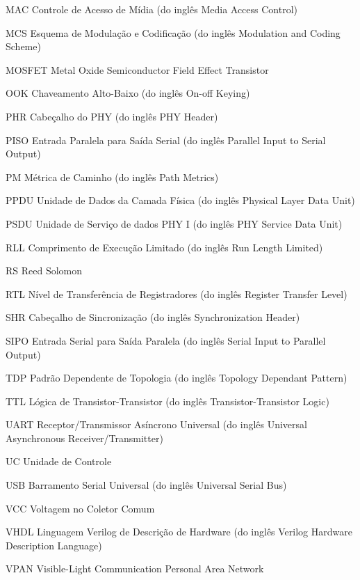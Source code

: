 \documentclass[
	12pt,				%
	openright,			%
	oneside,			%
	a4paper,			%
	hyphens,			%
	english,			%
	brazil				%
]{abntex2}
\begin{document}
\begin{siglas}
		\item[MAC] Controle de Acesso de Mídia (do inglês Media Access Control)
		\item[MCS] Esquema de Modulação e Codificação (do inglês Modulation and Coding Scheme)
		\item[MOSFET] Metal Oxide Semiconductor Field Effect Transistor
		\item[OOK] Chaveamento Alto-Baixo (do inglês On-off Keying)
		\item[PHR] Cabeçalho do PHY (do inglês PHY Header)
		\item[PISO] Entrada Paralela para Saída Serial (do inglês Parallel Input to Serial Output)
		\item[PM] Métrica de Caminho (do inglês Path Metrics)
		\item[PPDU] Unidade de Dados da Camada Física (do inglês Physical Layer Data Unit)
		\item[PSDU] Unidade de Serviço de dados PHY I (do inglês PHY Service Data Unit)
		\item[RLL] Comprimento de Execução Limitado (do inglês Run Length Limited)
		\item[RS] Reed Solomon
		\item[RTL] Nível de Transferência de Registradores (do inglês Register Transfer Level)
		\item[SHR] Cabeçalho de Sincronização (do inglês Synchronization Header)
		\item[SIPO] Entrada Serial para Saída Paralela (do inglês Serial Input to Parallel Output)
		\item[TDP] Padrão Dependente de Topologia (do inglês Topology Dependant Pattern)
		\item[TTL] Lógica de Transistor-Transistor (do inglês Transistor-Transistor Logic)
		\item[UART] Receptor/Transmissor Asíncrono Universal (do inglês Universal Asynchronous Receiver/Transmitter)
		\item[UC] Unidade de Controle
		\item[USB] Barramento Serial Universal (do inglês Universal Serial Bus)
		\item[VCC] Voltagem no Coletor Comum
		\item[VHDL] Linguagem Verilog de Descrição de Hardware (do inglês Verilog Hardware Description Language)
		\item[VPAN] Visible-Light Communication Personal Area Network
	\end{siglas}
	
	\tableofcontents*
	\cleardoublepage
	
\end{document}
